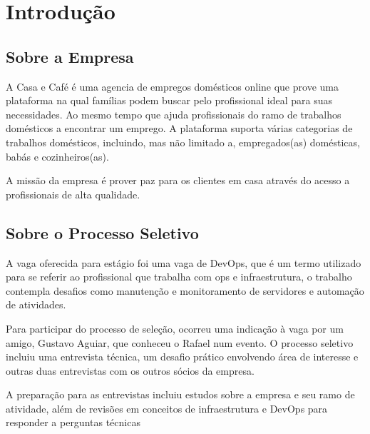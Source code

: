 \chapter{Introdução}\label{chap:intro}

\section{Sobre a Empresa}

A Casa e Café é uma agencia de empregos domésticos online que prove uma plataforma na qual famílias podem buscar pelo profissional ideal para suas necessidades. Ao mesmo tempo que ajuda profissionais do ramo de trabalhos domésticos a encontrar um emprego. A plataforma suporta várias categorias de trabalhos domésticos, incluindo, mas não limitado a, empregados(as) domésticas, babás e cozinheiros(as).

A missão da empresa é prover paz para os clientes em casa através do acesso a profissionais de alta qualidade.



\section{Sobre o Processo Seletivo}

A vaga oferecida para estágio foi uma vaga de DevOps, que é um termo utilizado para se referir ao profissional que trabalha com \gls{ops} e infraestrutura, o trabalho contempla desafios como manutenção e monitoramento de servidores e automação de atividades.

Para participar do processo de seleção, ocorreu uma indicação à vaga por um amigo, Gustavo Aguiar, que conheceu o Rafael num evento. O processo seletivo incluiu uma entrevista técnica, um desafio prático envolvendo área de interesse e outras duas entrevistas com os outros sócios da empresa.

A preparação para as entrevistas incluiu estudos sobre a empresa e seu ramo de atividade, além de revisões em conceitos de infraestrutura e DevOps para responder a perguntas técnicas

